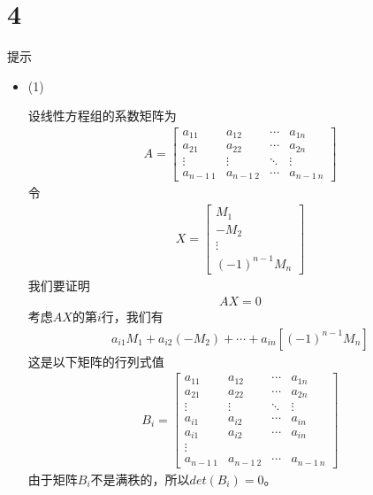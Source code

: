\documentclass{article}
\begin{document}
\section*{4}

提示
\begin{itemize}
  \item (1)

        设线性方程组的系数矩阵为
        \begin{align*}
          A = \begin{bmatrix}
                a_{11}      & a_{12}      & \cdots & a_{1n}      \\
                a_{21}      & a_{22}      & \cdots & a_{2n}      \\
                \vdots      & \vdots      & \ddots & \vdots      \\
                a_{n-1 \ 1} & a_{n-1 \ 2} & \cdots & a_{n-1 \ n}
              \end{bmatrix}
        \end{align*}
        令
        \begin{align*}
          X = \begin{bmatrix}
                M_1    \\
                -M_2   \\
                \vdots \\
                (-1)^{n - 1} M_n
              \end{bmatrix}
        \end{align*}
        我们要证明
        \begin{align*}
          A X = 0
        \end{align*}
        考虑$AX$的第$i$行，我们有
        \begin{align*}
          a_{i1} M_1 + a_{i2} (-M_2) + \cdots + a_{in} [(-1)^{n-1}M_n]
        \end{align*}
        这是以下矩阵的行列式值
        \begin{align*}
          B_i = \begin{bmatrix}
                  a_{11}      & a_{12}      & \cdots & a_{1n}      \\
                  a_{21}      & a_{22}      & \cdots & a_{2n}      \\
                  \vdots      & \vdots      & \ddots & \vdots      \\
                  a_{i1}      & a_{i2}      & \cdots & a_{in}      \\
                  a_{i1}      & a_{i2}      & \cdots & a_{in}      \\
                  \vdots                                           \\
                  a_{n-1 \ 1} & a_{n-1 \ 2} & \cdots & a_{n-1 \ n}
                \end{bmatrix}
        \end{align*}
        由于矩阵$B_i$不是满秩的，所以$det(B_i) = 0$。


\end{itemize}
\end{document}

